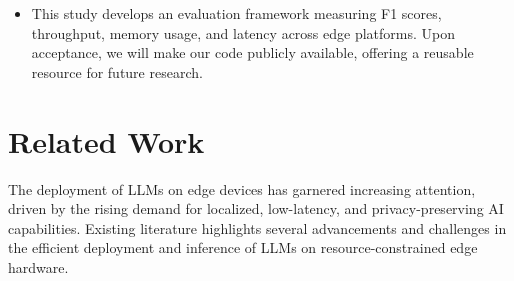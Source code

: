 \documentclass[conference]{IEEEtran}
\begin{document}
\begin{itemize}
    \item This study develops an evaluation framework measuring F1 scores, throughput, memory usage, and latency across edge platforms. Upon acceptance, we will make our code publicly available, offering a reusable resource for future research.
\end{itemize}

\section{Related Work}

The deployment of LLMs on edge devices has garnered increasing attention, driven by the rising demand for localized, low-latency, and privacy-preserving AI capabilities. Existing literature highlights several advancements and challenges in the efficient deployment and inference of LLMs on resource-constrained edge hardware.
\end{document}

